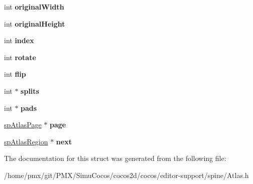 \begin{DoxyCompactItemize}
int {\bfseries original\+Width}
\item 
\mbox{\label{structspAtlasRegion_ad86104861e23369536ce8d55b256ee80}} 
int {\bfseries original\+Height}
\item 
\mbox{\label{structspAtlasRegion_aac9404e969e0178ff38b6b0f7d592442}} 
int {\bfseries index}
\item 
\mbox{\label{structspAtlasRegion_aad52dd94add05666e8e3f34e32111098}} 
int {\bfseries rotate}
\item 
\mbox{\label{structspAtlasRegion_ae5f7fcd52a2102a014b65a80bd186d04}} 
int {\bfseries flip}
\item 
\mbox{\label{structspAtlasRegion_a6ad7d8926468089d871cf6ba763724e1}} 
int $\ast$ {\bfseries splits}
\item 
\mbox{\label{structspAtlasRegion_ae4a0a8ce90f6221ffeffaec7b20ae2cc}} 
int $\ast$ {\bfseries pads}
\item 
\mbox{\label{structspAtlasRegion_af3cfad9db61cff62e7b2a9f6ae4a495e}} 
\hyperlink{structspAtlasPage}{sp\+Atlas\+Page} $\ast$ {\bfseries page}
\item 
\mbox{\label{structspAtlasRegion_ae8cd1e447951a9fc22c0f52bfcd41c33}} 
\hyperlink{structspAtlasRegion}{sp\+Atlas\+Region} $\ast$ {\bfseries next}
\end{DoxyCompactItemize}


The documentation for this struct was generated from the following file\+:\begin{DoxyCompactItemize}
\item 
/home/pmx/git/\+P\+M\+X/\+Simu\+Cocos/cocos2d/cocos/editor-\/support/spine/Atlas.\+h\end{DoxyCompactItemize}
